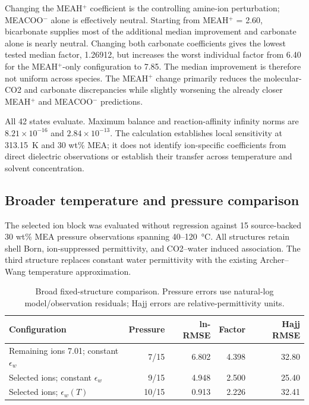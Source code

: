 Changing the MEAH$^+$ coefficient is the controlling amine-ion perturbation;
MEACOO$^-$ alone is effectively neutral. Starting from MEAH$^+$ = 2.60,
bicarbonate supplies most of the additional median improvement and carbonate
alone is nearly neutral. Changing both carbonate coefficients gives the lowest
tested median factor, 1.26912, but increases the worst individual factor from
6.40 for the MEAH$^+$-only configuration to 7.85. The median improvement is
therefore not uniform across species. The MEAH$^+$ change primarily reduces
the molecular-CO2 and carbonate discrepancies while slightly worsening the
already closer MEAH$^+$ and MEACOO$^-$ predictions.

All 42 states evaluate. Maximum balance and reaction-affinity infinity norms
are $8.21\times10^{-16}$ and $2.84\times10^{-13}$. The calculation establishes
local sensitivity at \SI{313.15}{\kelvin} and 30 wt\% MEA; it does not identify
ion-specific coefficients from direct dielectric observations or establish
their transfer across temperature and solvent concentration.

\subsection{Broader temperature and pressure comparison}

The selected ion block was evaluated without regression against 15
source-backed 30 wt\% MEA pressure observations spanning 40--\SI{120}{\celsius}.
All structures retain shell Born, ion-suppressed permittivity, and CO2--water
induced association. The third structure replaces constant water permittivity
with the existing Archer--Wang temperature approximation.

\begin{table}[ht]
\centering
\caption{Broad fixed-structure comparison. Pressure errors use natural-log
model/observation residuals; Hajj errors are relative-permittivity units.}
\begin{tabular}{lrrrr}
\toprule
Configuration & Pressure & ln-RMSE & Factor & Hajj RMSE \\
\midrule
Remaining ions 7.01; constant $\epsilon_w$ & 7/15 & 6.802 & 4.398 & 32.80 \\
Selected ions; constant $\epsilon_w$ & 9/15 & 4.948 & 2.500 & 25.40 \\
Selected ions; $\epsilon_w(T)$ & 10/15 & 0.913 & 2.226 & 32.41 \\
\bottomrule
\end{tabular}
\end{table}


